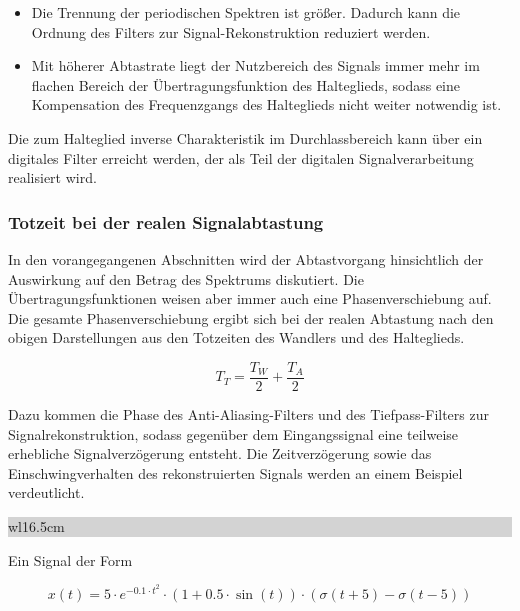 \begin{itemize}
\item  Die Trennung der periodischen Spektren ist gr\"{o}{\ss}er. Dadurch kann die Ordnung des Filters zur Signal-Rekonstruktion reduziert werden.

\item  Mit h\"{o}herer Abtastrate liegt der Nutzbereich des Signals immer mehr im flachen Bereich der \"{U}bertragungsfunktion des Halteglieds, sodass eine Kompensation des Frequenzgangs des Halteglieds nicht weiter notwendig ist.
\end{itemize}

\noindent Die zum Halteglied inverse Charakteristik im Durchlassbereich kann \"{u}ber ein digitales Filter erreicht werden, der als Teil der digitalen Signalverarbeitung realisiert wird. 


\subsubsection{Totzeit bei der realen Signalabtastung}

\noindent In den vorangegangenen Abschnitten wird der Abtastvorgang hinsichtlich der Auswirkung auf den Betrag des Spektrums diskutiert. Die \"{U}bertragungsfunktionen weisen aber immer auch eine Phasenverschiebung auf. Die gesamte Phasenverschiebung ergibt sich bei der realen Abtastung nach den obigen Darstellungen aus den Totzeiten des Wandlers und des Halteglieds.


\begin{equation}\label{eq:twothirtyone}
T_{T} =\frac{T_{W} }{2} +\frac{T_{A} }{2}
\end{equation}

\noindent Dazu kommen die Phase des Anti-Aliasing-Filters und des Tiefpass-Filters zur Signalrekonstruktion, sodass gegen\"{u}ber dem Eingangssignal eine teilweise erhebliche Signalverz\"{o}gerung entsteht. Die Zeitverz\"{o}gerung sowie das Einschwingverhalten des rekonstruierten Signals werden an einem Beispiel verdeutlicht.\bigskip

\noindent
\colorbox{lightgray}{%
%
\renewcommand\arraystretch{0.6}%
\begin{tabular}{ wl{16.5cm} }
{\selectfont{Beispiel: Signalrekonstruktion} }
\end{tabular}%
}\medskip

\noindent Ein Signal der Form 

\begin{equation}\label{eq:twothirtytwo}
x\left(t\right)=5\cdot e^{-0.1\cdot t^{2} } \cdot \left(1+0.5\cdot \sin \left(t\right)\right)\cdot \left(\sigma \left(t+5\right)-\sigma \left(t-5\right)\right)
\end{equation}

